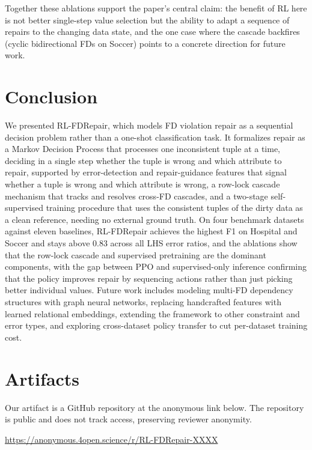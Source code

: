 \documentclass[sigconf]{acmart}
\begin{document}
Together these ablations support the paper's central claim: the benefit of RL here is not better single-step value selection but the ability to adapt a sequence of repairs to the changing data state, and the one case where the cascade backfires (cyclic bidirectional FDs on Soccer) points to a concrete direction for future work.

\section{Conclusion}
\label{sec:conclusion}

We presented RL-FDRepair, which models FD violation repair as a sequential decision problem rather than a one-shot classification task. It formalizes repair as a Markov Decision Process that processes one inconsistent tuple at a time, deciding in a single step whether the tuple is wrong and which attribute to repair, supported by error-detection and repair-guidance features that signal whether a tuple is wrong and which attribute is wrong, a row-lock cascade mechanism that tracks and resolves cross-FD cascades, and a two-stage self-supervised training procedure that uses the consistent tuples of the dirty data as a clean reference, needing no external ground truth. On four benchmark datasets against eleven baselines, RL-FDRepair achieves the highest F1 on Hospital and Soccer and stays above 0.83 across all LHS error ratios, and the ablations show that the row-lock cascade and supervised pretraining are the dominant components, with the gap between PPO and supervised-only inference confirming that the policy improves repair by sequencing actions rather than just picking better individual values. Future work includes modeling multi-FD dependency structures with graph neural networks, replacing handcrafted features with learned relational embeddings, extending the framework to other constraint and error types, and exploring cross-dataset policy transfer to cut per-dataset training cost.

\section{Artifacts}
\label{sec:artifacts}

Our artifact is a GitHub repository at the anonymous link below. The repository is public and does not track access, preserving reviewer anonymity.

\medskip
\noindent\url{https://anonymous.4open.science/r/RL-FDRepair-XXXX}
\medskip
\end{document}
